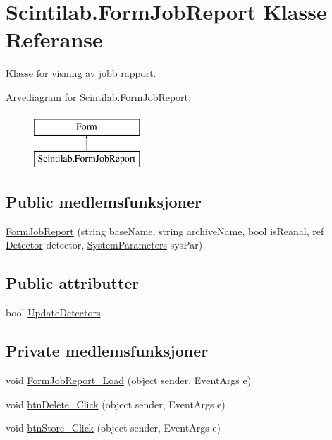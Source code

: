 \hypertarget{class_scintilab_1_1_form_job_report}{\section{Scintilab.\+Form\+Job\+Report Klasse Referanse}
\label{class_scintilab_1_1_form_job_report}
}


Klasse for visning av jobb rapport.  


Arvediagram for Scintilab.\+Form\+Job\+Report\+:\begin{figure}[H]
\begin{center}
\leavevmode
\includegraphics[height=2.000000cm]{class_scintilab_1_1_form_job_report}
\end{center}
\end{figure}
\subsection*{Public medlemsfunksjoner}
\begin{DoxyCompactItemize}
\item 
\hyperlink{class_scintilab_1_1_form_job_report_a2c7a3cd347504010eeb239fc2be05b11}{Form\+Job\+Report} (string base\+Name, string archive\+Name, bool is\+Reanal, ref \hyperlink{class_scintilab_1_1_detector}{Detector} detector, \hyperlink{class_scintilab_1_1_system_parameters}{System\+Parameters} sys\+Par)
\end{DoxyCompactItemize}
\subsection*{Public attributter}
\begin{DoxyCompactItemize}
\item 
bool \hyperlink{class_scintilab_1_1_form_job_report_a03fca1552c0a65c4e526318e880941ff}{Update\+Detectors}
\end{DoxyCompactItemize}
\subsection*{Private medlemsfunksjoner}
\begin{DoxyCompactItemize}
\item 
void \hyperlink{class_scintilab_1_1_form_job_report_a786144f69092cec36454726fdae09776}{Form\+Job\+Report\+\_\+\+Load} (object sender, Event\+Args e)
\item 
void \hyperlink{class_scintilab_1_1_form_job_report_a964b60494d05610029c4844d4712e0e6}{btn\+Delete\+\_\+\+Click} (object sender, Event\+Args e)
\item 
void \hyperlink{class_scintilab_1_1_form_job_report_a2b84afe1ef77debb1f31e8e8e129ebd6}{btn\+Store\+\_\+\+Click} (object sender, Event\+Args e)
\end{DoxyCompactItemize}
